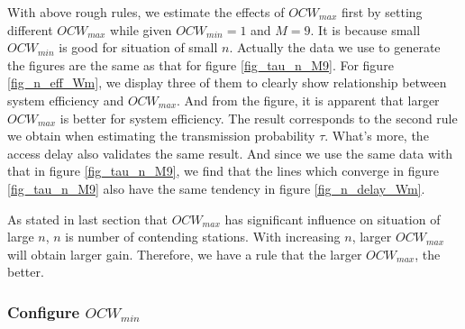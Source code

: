 \documentclass[journal]{IEEEtran}
\begin{document}
With above rough rules, we estimate the effects of $OCW_{max}$ first by setting different $OCW_{max}$ while given $OCW_{min}=1$ and $M=9$.
It is because small $OCW_{min}$ is good for situation of small $n$.
Actually the data we use to generate the figures are the same as that for figure \ref{fig_tau_n_M9}. For figure \ref{fig_n_eff_Wm}, we display three of them to clearly show relationship between system efficiency and $OCW_{max}$.
And from the figure, it is apparent that larger $OCW_{max}$ is better for system efficiency. 
The result corresponds to the second rule we obtain when estimating the transmission probability $\tau$.
What's more, the access delay also validates the same result. And since we use the same data with that in figure \ref{fig_tau_n_M9}, we find that the lines which converge in figure \ref{fig_tau_n_M9} also have the same tendency in figure \ref{fig_n_delay_Wm}. 

As stated in last section that $OCW_{max}$ has significant influence on situation of large $n$, $n$ is number of contending stations. With increasing $n$, larger $OCW_{max}$ will obtain larger gain. 
Therefore, we have a rule that the larger $OCW_{max}$, the better.



\subsubsection{Configure $OCW_{min}$}
\end{document}
